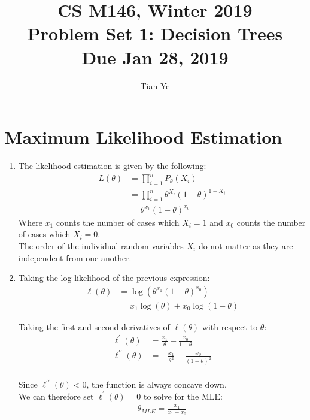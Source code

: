 \documentclass[11pt]{article}
\newcommand{\cnum}{CS M146}
\newcommand{\ced}{Winter 2019}
\newcommand{\ctitle}[3]{\title{\vspace{-0.5in}\cnum, \ced\\Problem Set #1: #2\\Due #3}}
\newcommand{\solution}[1]{{{\color{blue}{\bf Solution:} {#1}}}}
\begin{document}
\ctitle{1}{Decision Trees}{Jan 28, 2019}
\author{Tian Ye}
\maketitle

\newpage

\section{Maximum Likelihood Estimation}
\begin{enumerate}
\item 

\solution{
The likelihood estimation is given by the following:
\begin{align}
L(\theta) &= \prod_{i=1}^{n} P_{\theta}(X_{i}) \\
	     &= \prod_{i=1}^{n} \theta^{X_{i}}(1-\theta)^{1-X_{i}} \\
	     &= \theta^{x_{1}}(1-\theta)^{x_{0}}
\end{align}
Where $x_{1}$ counts the number of cases which $X_{i} = 1$ and  $x_{0}$ counts the number of cases which $X_{i} = 0$. \\
The order of the individual random variables $X_{i}$ do not matter as they are independent from one another.
}

\vspace{1cm}

\item
\solution{
Taking the log likelihood of the previous expression:
\begin{align}
\ell(\theta) &= \log(\theta^{x_{1}}(1-\theta)^{x_{0}}) \\
                  &= x_{1}\log(\theta) + x_{0}\log(1-\theta)
\end{align}

Taking the first and second derivatives of $\ell(\theta)$ with respect to $\theta$:
\begin{align}
\ell^{\prime}(\theta) &= \frac{x_{1}}{\theta} - \frac{x_{0}}{1-\theta}\\
\ell^{\prime\prime}(\theta) &= -\frac{x_{1}}{\theta^2} - \frac{x_{0}}{(1-\theta)^2}\\
\end{align}

Since $\ell^{\prime\prime}(\theta) < 0$, the function is always concave down. \\
We can therefore set $\ell^{\prime}(\theta) = 0$ to solve for the MLE:
\begin{align}
\theta_{MLE} = \frac{x_1}{x_{1}+x_0}
\end{align}
}
\newpage



\end{enumerate}
\end{document}
